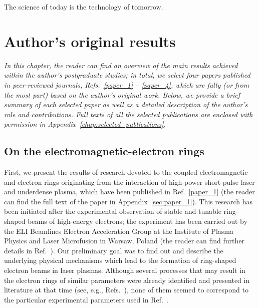 \documentclass[10pt, a4paper, twoside, openright]{report}
\begin{document}

\begin{savequote}[0.45\linewidth]
	\begin{fquote}
		 The science of today is the technology of tomorrow.
	\end{fquote}
\end{savequote}

\chapter{Author's original results\label{chap:authors_original_results}}
%

\textsl{In this chapter, the reader can find an overview of the main results achieved within the author's postgraduate studies; in total, we select four papers published in peer-reviewed journals, Refs.~\ref{paper_1} -- \ref{paper_4}, which are fully (or from the most part) based on the author's original work. Below, we provide a brief summary of each selected paper as well as a detailed description of the author's role and contributions. Full texts of all the selected publications are enclosed with permission in Appendix~\ref{chap:selected_publications}.}

\section{On the electromagnetic-electron rings\label{sec:on_the_electromagnetic-electron_rings}}
%

First, we present the results of research devoted to the coupled electromagnetic and electron rings originating from the interaction of high-power short-pulse laser and underdense plasma, which have been published in Ref.~\ref{paper_1} (the reader can find the full text of the paper in Appendix~\ref{sec:paper_1}). This research has been initiated after the experimental observation of stable and tunable ring-shaped beams of high-energy electrons; the experiment has been carried out by the ELI Beamlines Electron Acceleration Group at the Institute of Plasma Physics and Laser Microfusion in Warsaw, Poland (the reader can find further details in Ref.~). Our preliminary goal was to find out and describe the underlying physical mechanisms which lead to the formation of ring-shaped electron beams in laser plasmas. Although several processes that may result in the electron rings of similar parameters were already identified and presented in literature at that time (see, e.g., Refs.~), none of them seemed to correspond to the particular experimental parameters used in Ref.~.
\end{document}
